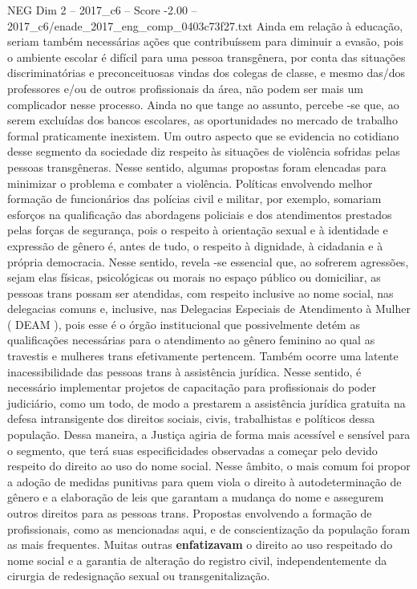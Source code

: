 \begin{textsample}{NEG Dim 2 – 2017\_c6 – Score -2.00 – 2017\_c6/enade\_2017\_eng\_comp\_0403c73f27.txt}
Ainda em relação à educação, seriam também necessárias ações que contribuíssem para diminuir a evasão, pois o ambiente escolar é difícil para uma pessoa transgênera, por conta das situações discriminatórias e preconceituosas vindas dos colegas de classe, e mesmo das/dos professores e/ou de outros profissionais da área, não podem ser mais um complicador nesse processo.
Ainda no que tange ao assunto, percebe -se que, ao serem excluídas dos bancos escolares, as oportunidades no mercado de trabalho formal praticamente inexistem.
Um outro aspecto que se evidencia no cotidiano desse segmento da sociedade diz respeito às situações de violência sofridas pelas pessoas transgêneras.
Nesse sentido, algumas propostas foram elencadas para minimizar o problema e combater a violência.
Políticas envolvendo melhor formação de funcionários das polícias civil e militar, por exemplo, somariam esforços na qualificação das abordagens policiais e dos atendimentos prestados pelas forças de segurança, pois o respeito à orientação sexual e à identidade e expressão de gênero é, antes de tudo, o respeito à dignidade, à cidadania e à própria democracia.
Nesse sentido, revela -se essencial que, ao sofrerem agressões, sejam elas físicas, psicológicas ou morais no espaço público ou domiciliar, as pessoas trans possam ser atendidas, com respeito inclusive ao nome social, nas delegacias comuns e, inclusive, nas Delegacias Especiais de Atendimento à Mulher ( DEAM ), pois esse é o órgão institucional que possivelmente detém as qualificações necessárias para o atendimento ao gênero feminino ao qual as travestis e mulheres trans efetivamente pertencem.
Também ocorre uma latente inacessibilidade das pessoas trans à assistência jurídica.
Nesse sentido, é necessário implementar projetos de capacitação para profissionais do poder judiciário, como um todo, de modo a prestarem a assistência jurídica gratuita na defesa intransigente dos direitos sociais, civis, trabalhistas e políticos dessa população.
Dessa maneira, a Justiça agiria de forma mais acessível e sensível para o segmento, que terá suas especificidades observadas a começar pelo devido respeito do direito ao uso do nome social.
Nesse âmbito, o mais comum foi propor a adoção de medidas punitivas para quem viola o direito à autodeterminação de gênero e a elaboração de leis que garantam a mudança do nome e assegurem outros direitos para as pessoas trans.
Propostas envolvendo a formação de profissionais, como as mencionadas aqui, e de conscientização da população foram as mais frequentes.
Muitas outras \textbf{enfatizavam} o direito ao uso respeitado do nome social e a garantia de alteração do registro civil, independentemente da cirurgia de redesignação sexual ou transgenitalização.

\end{textsample}
